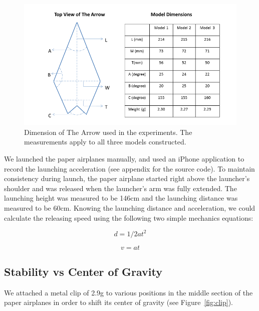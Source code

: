  
\begin{figure}[hl]
  \centering
    \includegraphics[scale=0.6]{figures/arrowdimension.png}
    \caption{Dimension of The Arrow used in the experiments. The measurements apply to all three models constructed.}
  \label{fig:arrowdimension}
\end{figure}

We launched the paper airplanes manually, and used an iPhone application to record the launching acceleration (see appendix for the source code). To maintain consistency during launch, the paper airplane started right above the launcher's shoulder and was released when the launcher's arm was fully extended. The launching height was measured to be 146cm and the launching distance was measured to be 60cm. Knowing the launching distance and acceleration, we could calculate the releasing speed using the following two simple mechanics equations:

\begin{equation}
	\label{kinematics1}
		d = 1/2 a t^2
\end{equation}

\begin{equation}
	\label{kinematics2}
		v = a t
\end{equation}		

	
\subsection{Stability vs Center of Gravity}
We attached a metal clip of 2.9g to various positions in the middle section of the paper airplanes in order to shift its center of gravity (see Figure~\ref{fig:clip}).


